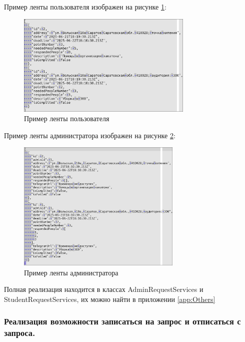 Пример ленты пользователя изображен на рисунке \ref{fig:PublicFeed}:

\newpage
\begin{figure}[!h]
    \centering
    \includegraphics[width = 0.75\textwidth]{imgs/PublicFeed.png}
    \caption{Пример ленты пользователя}
    \label{fig:PublicFeed}
\end{figure}

Пример ленты администратора изображен на рисунке \ref{fig:AdminFeed}:

\begin{figure}[!h]
    \centering
    \includegraphics[width = 0.7\textwidth]{imgs/AdminFeed.png}
    \caption{Пример ленты администратора}
    \label{fig:AdminFeed}
\end{figure}
Полная реализация находится в классах AdminRequestServices и StudentRequestServices, их можно найти в приложении \ref{app:Others}

\subsubsection{Реализация возможности записаться на запрос и отписаться с запроса.}

